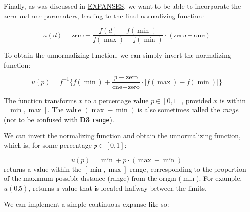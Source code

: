 \documentclass[
]{book}
\theoremstyle{definition}
\theoremstyle{definition}
\theoremstyle{definition}
\theoremstyle{definition}
\theoremstyle{remark}
\begin{document}
Finally, as was discussed in \hyperref[expanses]{EXPANSES}, we want to be able to incorporate the zero and one paramaters, leading to the final normalizing function:

\[n(d) = \text{zero} + \frac{f(d) - f(\min)}{f(\max) - f(\min)} \cdot (\text{zero} - \text{one})\]

To obtain the unnormalizing function, we can simply invert the normalizing function:

\[u(p) = f^{-1} \bigg\{ f(\min) + \frac{p - \text{zero}}{\text{one} - \text{zero}} \cdot \big[ f(\max) - f(\min) \big] \bigg\}\]

The function transforms \(x\) to a percentage value \(p \in [0, 1]\), provided \(x\) is within \([\min, \max]\). The value \((\max - \min)\) is also sometimes called the \emph{range} (not to be confused with \textbf{D3} \texttt{range}).

We can invert the normalizing function and obtain the unnormalizing function, which is, for some percentage \(p \in [0, 1]\):

\[u(p) = \min + p \cdot (\max - \min)\]
returns a value within the \([\min, \max]\) range, corresponding to the proportion of the maximum possible distance (range) from the origin (\(\min\)). For example, \(u(0.5)\), returns a value that is located halfway between the limits.

We can implement a simple continuous expanse like so:
\end{document}
